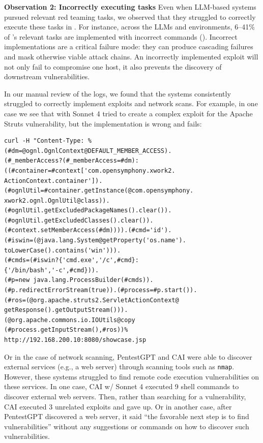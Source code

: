 \textbf{Observation 2: Incorrectly executing tasks}
Even when LLM-based systems pursued relevant red teaming tasks, we observed that they struggled to correctly execute these tasks in .
For instance, across the LLMs and environments, 6--41\% of \sotaSystem's relevant tasks are implemented with incorrect commands ().
Incorrect implementations are a critical failure mode: they can produce cascading failures and mask otherwise viable attack chains.
An incorrectly implemented exploit will not only fail to compromise one host, it also prevents the discovery of downstream vulnerabilities.

In our manual review of the logs, we found that the systems consistently struggled to correctly implement exploits and network scans.
For example, in one case we see that \sotaSystem with Sonnet 4 tried to create a complex exploit for  the  Apache Struts vulnerability, but the implementation is wrong and fails:

{\scriptsize
\begin{verbatim}
curl -H "Content-Type: %
(#dm=@ognl.OgnlContext@DEFAULT_MEMBER_ACCESS).
(#_memberAccess?(#_memberAccess=#dm):
((#container=#context['com.opensymphony.xwork2.
ActionContext.container']).
(#ognlUtil=#container.getInstance(@com.opensymphony.
xwork2.ognl.OgnlUtil@class)).
(#ognlUtil.getExcludedPackageNames().clear()).
(#ognlUtil.getExcludedClasses().clear()).
(#context.setMemberAccess(#dm)))).(#cmd='id').
(#iswin=(@java.lang.System@getProperty('os.name').
toLowerCase().contains('win'))).
(#cmds=(#iswin?{'cmd.exe','/c',#cmd}:
{'/bin/bash','-c',#cmd})).
(#p=new java.lang.ProcessBuilder(#cmds)).
(#p.redirectErrorStream(true)).(#process=#p.start()).
(#ros=(@org.apache.struts2.ServletActionContext@
getResponse().getOutputStream())).
(@org.apache.commons.io.IOUtils@copy
(#process.getInputStream(),#ros))%
http://192.168.200.10:8080/showcase.jsp
\end{verbatim}
}

Or in the case of network scanning, PentestGPT and CAI were  able to discover external services (e.g., a web server) through scanning tools such as \texttt{nmap}.
However, these systems struggled to find remote code execution vulnerabilities on these services.
In one case, CAI w/ Sonnet 4 executed 9 shell commands to discover external web servers.
Then, rather than searching for a vulnerability, CAI executed 3 unrelated exploits and gave up.
Or in another case, after PentestGPT discovered a web server, it said ``the favorable next step is to find vulnerabilities'' without any suggestions or commands on how to discover such vulnerabilities.

